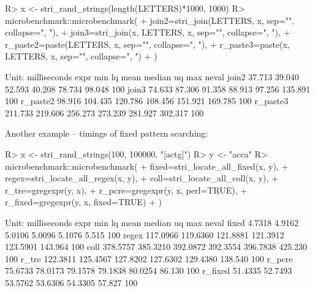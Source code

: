 \documentclass[nojss]{jss}
\begin{document}
\begin{Schunk}
\begin{Sinput}
R> x <- stri_rand_strings(length(LETTERS)*1000, 1000)
R> microbenchmark::microbenchmark(
+    join2=stri_join(LETTERS, x, sep="", collapse=", "),
+    join3=stri_join(x, LETTERS, x, sep="", collapse=", "),
+    r_paste2=paste(LETTERS, x, sep="", collapse=", "),
+    r_paste3=paste(x, LETTERS, x, sep="", collapse=", ")
+  )
\end{Sinput}
\begin{Soutput}
Unit: milliseconds
     expr     min      lq    mean  median      uq     max neval
    join2  37.713  39.040  52.593  40.208  78.734  98.048   100
    join3  74.633  87.306  91.358  88.913  97.256 135.891   100
 r_paste2  98.916 104.435 120.786 108.456 151.921 169.785   100
 r_paste3 211.733 219.606 256.273 273.239 281.927 302.317   100
\end{Soutput}
\end{Schunk}

Another example -- timings of fixed pattern searching:

\begin{Schunk}
\begin{Sinput}
R> x <- stri_rand_strings(100, 100000, "[actg]")
R> y <- "acca"
R> microbenchmark::microbenchmark(
+    fixed=stri_locate_all_fixed(x, y),
+    regex=stri_locate_all_regex(x, y),
+    coll=stri_locate_all_coll(x, y),
+    r_tre=gregexpr(y, x),
+    r_pcre=gregexpr(y, x, perl=TRUE),
+    r_fixed=gregexpr(y, x, fixed=TRUE)
+  )
\end{Sinput}
\begin{Soutput}
Unit: milliseconds
    expr      min       lq     mean   median       uq     max neval
   fixed   4.7318   4.9162   5.0106   5.0096   5.1076   5.515   100
   regex 117.0966 119.6360 121.8881 121.3912 123.5901 143.964   100
    coll 378.5757 385.3210 392.0872 392.3554 396.7838 425.230   100
   r_tre 122.3811 125.4567 127.8202 127.6302 129.4380 138.540   100
  r_pcre  75.6733  78.0173  79.1578  79.1838  80.0254  86.130   100
 r_fixed  51.4335  52.7493  53.5762  53.6306  54.3305  57.827   100
\end{Soutput}
\end{Schunk}



%
%
%
\end{document}
